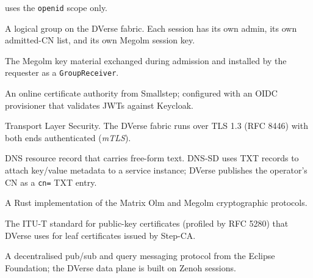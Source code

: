 \documentclass[11pt,a4paper]{article}
\begin{document}
\begin{description}[leftmargin=2.6cm, style=nextline, font=\sffamily\bfseries]
        uses the \texttt{openid} scope only.
  \item[session] A logical group on the DVerse fabric. Each
        session has its own admin, its own admitted-CN list,
        and its own Megolm session key.
  \item[\texttt{SessionKey}] The Megolm key material
        exchanged during admission and installed by the
        requester as a \texttt{GroupReceiver}.
  \item[Step-CA] An online certificate authority from
        Smallstep; configured with an OIDC provisioner that
        validates JWTs against Keycloak.
  \item[TLS] Transport Layer Security. The DVerse fabric
        runs over TLS 1.3 (RFC 8446) with both ends
        authenticated (\emph{mTLS}).
  \item[TXT record] DNS resource record that carries free-form
        text. DNS-SD uses TXT records to attach key/value
        metadata to a service instance; DVerse publishes the
        operator's CN as a \texttt{cn=} TXT entry.
  \item[vodozemac] A Rust implementation of the Matrix Olm
        and Megolm cryptographic protocols.
  \item[X.509] The ITU-T standard for public-key certificates
        (profiled by RFC 5280) that DVerse uses for leaf
        certificates issued by Step-CA.
  \item[Zenoh] A decentralised pub/sub and query messaging
        protocol from the Eclipse Foundation; the DVerse data
        plane is built on Zenoh sessions.
\end{description}



\end{document}
